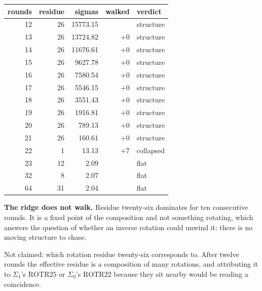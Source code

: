 \begin{center}
\begin{tabular}{rrrrl}
\toprule
rounds & residue & sigmas & walked & verdict \\
\midrule
12 & 26 & 15773.15 & \textemdash{} & structure \\
13 & 26 & 13724.82 & \(+0\) & structure \\
14 & 26 & 11676.61 & \(+0\) & structure \\
15 & 26 & 9627.78 & \(+0\) & structure \\
16 & 26 & 7580.54 & \(+0\) & structure \\
17 & 26 & 5546.15 & \(+0\) & structure \\
18 & 26 & 3551.43 & \(+0\) & structure \\
19 & 26 & 1916.81 & \(+0\) & structure \\
20 & 26 & 789.13 & \(+0\) & structure \\
21 & 26 & 160.61 & \(+0\) & structure \\
22 & 1 & 13.13 & \(+7\) & collapsed \\
23 & 12 & 2.09 & \textemdash{} & flat \\
32 & 8 & 2.07 & \textemdash{} & flat \\
64 & 31 & 2.04 & \textemdash{} & flat \\
\bottomrule
\end{tabular}
\end{center}

\textbf{The ridge does not walk.} Residue twenty-six dominates for ten consecutive rounds. It is a fixed point of the composition and not something rotating, which answers the question of whether an inverse rotation could unwind it: there is no moving structure to chase.

Not claimed: which rotation residue twenty-six corresponds to. After twelve rounds the effective residue is a composition of many rotations, and attributing it to \(\Sigma_1\)'s \(\mathrm{ROTR}25\) or \(\Sigma_0\)'s \(\mathrm{ROTR}22\) because they sit nearby would be reading a coincidence.

\begin{center}
\end{center}

